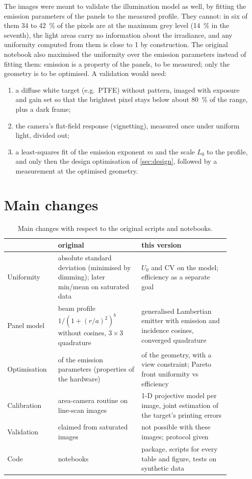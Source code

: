 \documentclass[11pt,a4paper]{article}
\begin{document}
The images were meant to validate the illumination model as well, by fitting the emission parameters of the panels
to the measured profile. They cannot: in six of them 34 to \SI{42}{\percent} of the pixels are at the maximum grey level (\SI{14}{\percent} in the seventh), the
light areas carry no information about the irradiance, and any uniformity computed from them is close to 1 by
construction. The original notebook also maximised the uniformity over the emission parameters instead of fitting
them: emission is a property of the panels, to be measured; only the geometry is to be optimised. A validation
would need:
\begin{enumerate}
  \item a diffuse white target (e.g.\ PTFE) without pattern, imaged with exposure and gain set so that the brightest
    pixel stays below about \SI{80}{\percent} of the range, plus a dark frame;
  \item the camera's flat-field response (vignetting), measured once under uniform light, divided out;
  \item a least-squares fit of the emission exponent $m$ and the scale $L_0$ to the profile, and only then the
    design optimisation of \cref{sec:design}, followed by a measurement at the optimised geometry.
\end{enumerate}

\section{Main changes}

\begin{table}[H]
  \centering\small
  \caption{Main changes with respect to the original scripts and notebooks.}
  \begin{tabular}{p{0.2\linewidth}p{0.34\linewidth}p{0.36\linewidth}}
    \toprule
    & original & this version \\
    \midrule
    Uniformity & absolute standard deviation (minimised by dimming); later min/mean on saturated data & $U_0$ and CV
      on the model; efficiency as a separate goal \\
    Panel model & beam profile $1/(1 + (r/a)^2)^b$ without cosines, $3 \times 3$ quadrature & generalised Lambertian
      emitter with emission and incidence cosines, converged quadrature \\
    Optimisation & of the emission parameters (properties of the hardware) & of the geometry, with a view constraint;
      Pareto front uniformity vs efficiency \\
    Calibration & area-camera routine on line-scan images & 1-D projective model per image, joint estimation of the
      target's printing errors \\
    Validation & claimed from saturated images & not possible with these images; protocol given \\
    Code & notebooks & package, scripts for every table and figure, tests on synthetic data \\
    \bottomrule
  \end{tabular}
\end{table}
\end{document}
